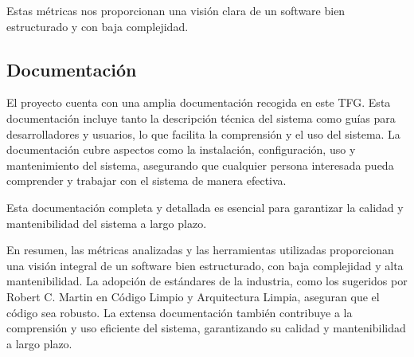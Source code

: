Estas métricas nos proporcionan una visión clara de un software bien estructurado y con baja complejidad.

\subsection{Documentación}

El proyecto cuenta con una amplia documentación recogida en este TFG.
Esta documentación incluye tanto la descripción técnica del sistema como guías para desarrolladores y usuarios, lo que
facilita la comprensión y el uso del sistema.
La documentación cubre aspectos como la instalación, configuración, uso y mantenimiento del sistema, asegurando que
cualquier persona interesada pueda comprender y trabajar con el sistema de manera efectiva.

Esta documentación completa y detallada es esencial para garantizar la calidad y mantenibilidad del sistema a largo
plazo.

En resumen, las métricas analizadas y las herramientas utilizadas proporcionan una visión integral de un software bien
estructurado, con baja complejidad y alta mantenibilidad.
La adopción de estándares de la industria, como los sugeridos por Robert C. Martin en Código Limpio y Arquitectura
Limpia, aseguran que el código sea robusto.
La extensa documentación también contribuye a la comprensión y uso eficiente del sistema, garantizando su calidad y
mantenibilidad a largo plazo.












